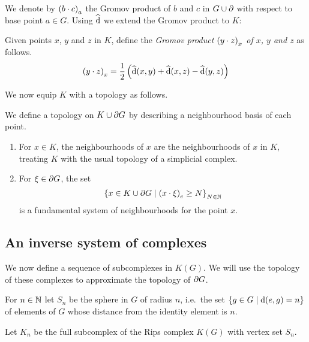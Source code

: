 \documentclass[a4paper]{article}
\begin{document}
We denote by $\gromov{a}{b}{c}$ the Gromov product of $b$ and $c$ in $G \union
\boundary$ with respect to base point $a \in G$. Using $\newdist$ we extend the
Gromov product to $K$:

\begin{definition}
  Given points $x$, $y$ and $z$ in $K$, define the \emph{Gromov product
  $\gromov{x}{y}{z}$ of $x$, $y$ and $z$} as follows.
  \begin{equation*}
    \gromov{x}{y}{z} = \frac{1}{2}\left(\newdist(x,y) + \newdist(x,z) -
          \newdist(y,z)\right)
  \end{equation*}
\end{definition}

We now equip $K$ with a topology as follows.

\begin{definition}
  We define a topology on $K \union \boundary G$ by describing a neighbourhood
  basis of each point.
  \begin{enumerate}
    \item For $x \in K$, the neighbourhoods of $x$ are the neighbourhoods of
      $x$ in $K$, treating $K$ with the usual topology of a simplicial complex.
    \item For $\xi \in \boundary G$, the set
      \begin{equation*}
        \set{x \in K \union \boundary G 
              \suchthat \gromov{e}{x}{\xi} \geq N}_{N\in\naturals}
      \end{equation*}
      is a fundamental system of neighbourhoods for the point $x$.
  \end{enumerate}
\end{definition}

\subsection{An inverse system of complexes}

We now define a sequence of subcomplexes in $K(G)$. We will use the topology of
these complexes to approximate the topology of $\boundary G$. 

\begin{definition}
  For $n \in \naturals$ let $S_n$ be the sphere in $G$ of radius $n$, i.e.\ the 
  set $\set{g \in G \suchthat \dist(e, g) = n}$ of elements of $G$ whose 
  distance from the identity element is $n$. 

  Let $K_n$ be the full subcomplex of the Rips complex $K(G)$ with vertex set
  $S_n$.
\end{definition}
\end{document}
